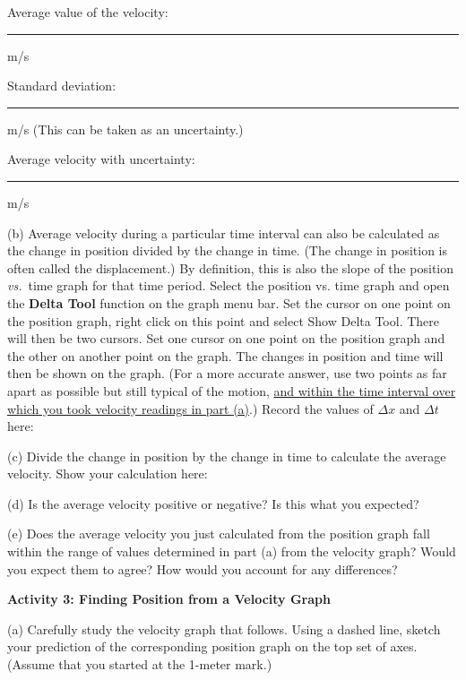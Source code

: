 \answerspace{5mm}

Average value of the velocity: \rule{1.0in}{0.1pt} m/s

Standard deviation: \rule{1.0in}{0.1pt} m/s     (This can be taken as an uncertainty.)

Average velocity with uncertainty: \rule{1.5in}{0.1pt} m/s

(b) Average velocity during a particular time interval can also be calculated
as the change in position divided by the change in time. (The change in position
is often called the displacement.) By definition, this is also the slope of
the position \textit{vs.}~time graph for that time period. Select the position vs. time graph and open the \textbf{Delta Tool} function on the graph menu bar.  Set the cursor on one point on the position graph, right click on this point and select Show Delta Tool.  There will then be two cursors.  Set one cursor on one point on the position graph and the other on another point on the graph.  The changes in position and time will then be shown on the graph. (For a more accurate answer, use two points as far apart
as possible but still typical of the motion, \underline{and within the time 
interval over which you took velocity readings in part (a)}.) 
Record the values of \( \Delta x\) and \( \Delta t\) here:
\answerspace{10mm}

(c) Divide the change in position by the change in time to calculate the average velocity.  Show your calculation here:
\answerspace{15mm}

(d) Is the average velocity positive or negative? Is this what you expected? 
\answerspace{15mm}

\pagebreak[2]
(e) Does the average velocity you just calculated from the position graph fall within the range of values determined in part (a) from the velocity graph? Would you expect them to agree? How would you account for any differences?
\vspace{20mm}

\textbf{Activity 3: Finding Position from a Velocity Graph }

(a) Carefully study the velocity graph that follows. Using a dashed line, sketch your prediction of the corresponding position graph on the top set of axes.
(Assume that you started at the 1-meter mark.)

